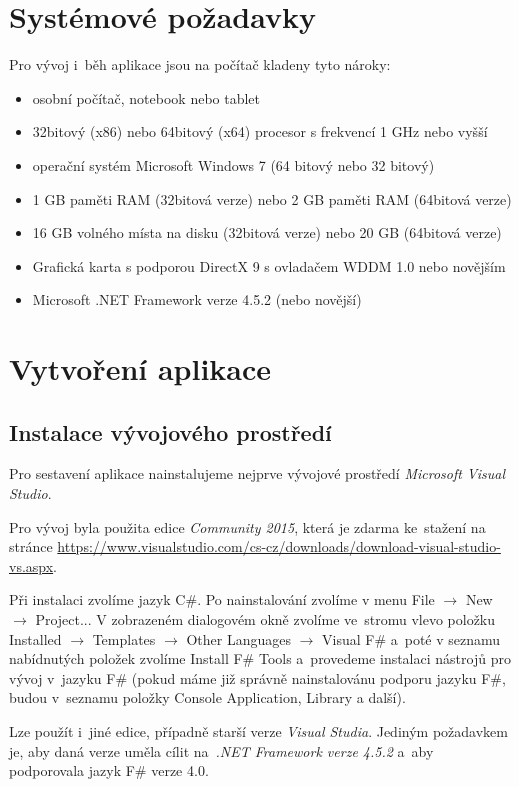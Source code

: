 \documentclass[12pt]{article}
\begin{document}
\section{Systémové požadavky}
Pro vývoj i~běh aplikace jsou na počítač kladeny tyto nároky:
	\begin{itemize}  
		\item osobní počítač, notebook nebo tablet
		\item 32bitový (x86) nebo 64bitový (x64) procesor s frekvencí 1 GHz nebo vyšší
		\item operační systém Microsoft Windows 7 (64 bitový nebo 32 bitový)
		\item 1 GB paměti RAM (32bitová verze) nebo 2 GB paměti RAM (64bitová verze)
		\item 16 GB volného místa na disku (32bitová verze) nebo 20 GB (64bitová verze)
		\item Grafická karta s podporou DirectX 9 s ovladačem WDDM 1.0 nebo novějším
		\item Microsoft .NET Framework verze 4.5.2 (nebo novější)
	\end{itemize}

\section{Vytvoření aplikace}
\subsection{Instalace vývojového prostředí}
Pro sestavení aplikace nainstalujeme nejprve vývojové prostředí \emph{Microsoft Visual Studio}.

Pro vývoj byla použita edice \emph{Community 2015}, která je zdarma ke~stažení na stránce \url{https://www.visualstudio.com/cs-cz/downloads/download-visual-studio-vs.aspx}. 

Při instalaci zvolíme jazyk C\#. Po nainstalování zvolíme v menu File $\rightarrow$ New $\rightarrow$ Project... V zobrazeném dialogovém okně zvolíme ve~stromu vlevo položku Installed $\rightarrow$ Templates $\rightarrow$ Other Languages $\rightarrow$ Visual F\# a~poté v seznamu nabídnutých položek zvolíme Install F\# Tools a~provedeme instalaci nástrojů pro vývoj v~jazyku F\# (pokud máme již správně nainstalovánu podporu jazyku F\#, budou v~seznamu položky Console Application, Library a další).

Lze použít i~jiné edice, případně starší verze \emph{Visual Studia}. Jediným požadavkem je, aby daná verze uměla cílit na~\emph{.NET Framework verze 4.5.2} a~aby podporovala jazyk F\# verze 4.0.
\end{document}
